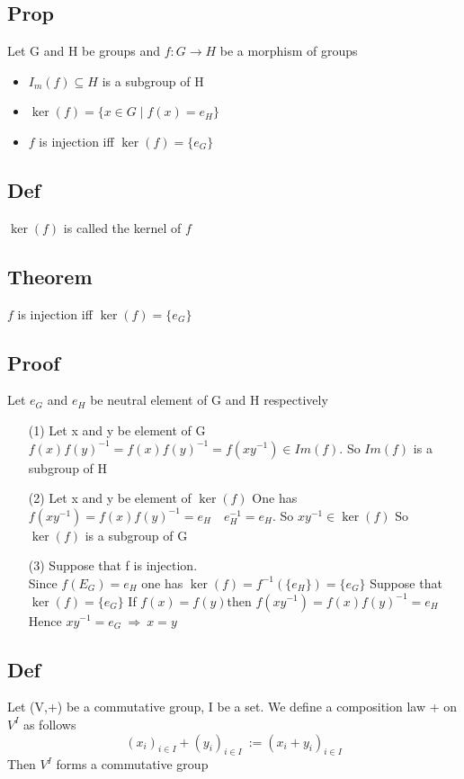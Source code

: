 \documentclass{book}
\begin{document}
\subsection{Prop}

Let G and H be groups and $f:G\rightarrow H$ be a morphism of groups\begin{itemize}
    \item $I_m(f)\subseteq H $ is a subgroup of H
    \item $\ker(f)=\{x\in G\mid f(x)=e_H\}$
    \item $f$ is injection iff $\ker(f)=\{e_G\}$
\end{itemize}
\subsection{Def}

$\ker(f)$ is called the kernel of $f$
\subsection{Theorem}
$f$ is injection iff $\ker(f)=\{e_G\}$
\subsection*{Proof}
Let $e_G$ and $e_H$ be neutral element of G and H respectively
\begin{itemize}
    \item [(1)]Let x and y be element of G\\$f(x)f(y)^{-1}=f(x)f(y)^{-1}=f(xy^{-1})\in Im(f).$ So $Im(f)$ is a subgroup of H
    \item [(2)]Let x and y be element of $\ker(f)$ One has $f(xy^{-1})=f(x)f(y)^{-1}=e_H\quad e_H^{-1}=e_H.$ So $xy^{-1}\in\ker(f)$ So $\ker(f)$ is a subgroup of G
    \item [(3)]Suppose that f is injection.\\ Since $f(E_G)=e_H$ one has $\ker(f)=f^{-1}(\{e_H\})=\{e_G\}$ Suppose that $\ker(f)=\{e_G\}$ If $f(x)=f(y)$then $f(xy^{-1})=f(x)f(y)^{-1}=e_H$\\Hence $xy^{-1}=e_G\ \Rightarrow\ x=y$
\end{itemize}
\subsection{Def}

Let (V,+) be a commutative group, I be a set. We define a composition law + on $V^I$ as follows$$(x_i)_{i\in I}+(y_i)_{i\in I}\ :=(x_i+y_i)_{i\in I}$$
Then $V^I$ forms a commutative group
\end{document}
